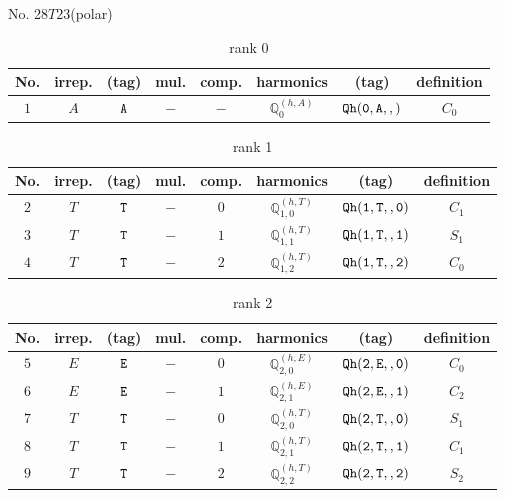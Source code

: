 \documentclass[fleqn,8pt]{jsarticle}
\begin{document}
\setcounter{MaxMatrixCols}{16}

\begin{center}
\LARGE
No. 28\quad$T$\quad$23$\quad[ cubic ] (polar)
\end{center}
\begin{table}[ht!]
\begin{center}
\caption{rank 0}
\renewcommand{\arraystretch}{1.3}
\begin{tabular}{cccccccc} \hline \hline
No. & irrep. & (tag) & mul. & comp. & harmonics & (tag) & definition \\ \hline
$ 1 $ & $ A $ & $ {\tt A} $ & $ - $ & $ - $ & $ \mathbb{Q}_{0}^{(h,A)} $ & $ {\tt Qh(0,A,,)} $ & $ C_{0} $ \\
 \hline \hline
\end{tabular}
\end{center}
\end{table}
\begin{table}[ht!]
\begin{center}
\caption{rank 1}
\renewcommand{\arraystretch}{1.3}
\begin{tabular}{cccccccc} \hline \hline
No. & irrep. & (tag) & mul. & comp. & harmonics & (tag) & definition \\ \hline
$ 2 $ & $ T $ & $ {\tt T} $ & $ - $ & $ 0 $ & $ \mathbb{Q}_{1,0}^{(h,T)} $ & $ {\tt Qh(1,T,,0)} $ & $ C_{1} $ \\
$ 3 $ & $ T $ & $ {\tt T} $ & $ - $ & $ 1 $ & $ \mathbb{Q}_{1,1}^{(h,T)} $ & $ {\tt Qh(1,T,,1)} $ & $ S_{1} $ \\
$ 4 $ & $ T $ & $ {\tt T} $ & $ - $ & $ 2 $ & $ \mathbb{Q}_{1,2}^{(h,T)} $ & $ {\tt Qh(1,T,,2)} $ & $ C_{0} $ \\
 \hline \hline
\end{tabular}
\end{center}
\end{table}
\begin{table}[ht!]
\begin{center}
\caption{rank 2}
\renewcommand{\arraystretch}{1.3}
\begin{tabular}{cccccccc} \hline \hline
No. & irrep. & (tag) & mul. & comp. & harmonics & (tag) & definition \\ \hline
$ 5 $ & $ E $ & $ {\tt E} $ & $ - $ & $ 0 $ & $ \mathbb{Q}_{2,0}^{(h,E)} $ & $ {\tt Qh(2,E,,0)} $ & $ C_{0} $ \\
$ 6 $ & $ E $ & $ {\tt E} $ & $ - $ & $ 1 $ & $ \mathbb{Q}_{2,1}^{(h,E)} $ & $ {\tt Qh(2,E,,1)} $ & $ C_{2} $ \\
$ 7 $ & $ T $ & $ {\tt T} $ & $ - $ & $ 0 $ & $ \mathbb{Q}_{2,0}^{(h,T)} $ & $ {\tt Qh(2,T,,0)} $ & $ S_{1} $ \\
$ 8 $ & $ T $ & $ {\tt T} $ & $ - $ & $ 1 $ & $ \mathbb{Q}_{2,1}^{(h,T)} $ & $ {\tt Qh(2,T,,1)} $ & $ C_{1} $ \\
$ 9 $ & $ T $ & $ {\tt T} $ & $ - $ & $ 2 $ & $ \mathbb{Q}_{2,2}^{(h,T)} $ & $ {\tt Qh(2,T,,2)} $ & $ S_{2} $ \\
 \hline \hline
\end{tabular}
\end{center}
\end{table}
\end{document}
